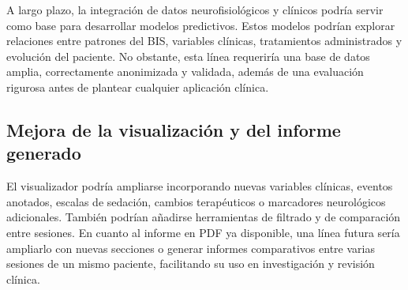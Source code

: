 \documentclass[
  spanish,
  a4paper,
  12pt,
  twoside]{memoir}
\begin{document}
A largo plazo, la integración de datos neurofisiológicos y clínicos
podría servir como base para desarrollar modelos predictivos. Estos
modelos podrían explorar relaciones entre patrones del BIS, variables
clínicas, tratamientos administrados y evolución del paciente. No
obstante, esta línea requeriría una base de datos amplia, correctamente
anonimizada y validada, además de una evaluación rigurosa antes de
plantear cualquier aplicación clínica.

\subsection{Mejora de la visualización y del informe
generado}\label{mejora-de-la-visualizaciuxf3n-y-del-informe-generado}

El visualizador podría ampliarse incorporando nuevas variables clínicas,
eventos anotados, escalas de sedación, cambios terapéuticos o marcadores
neurológicos adicionales. También podrían añadirse herramientas de
filtrado y de comparación entre sesiones. En cuanto al informe en PDF ya
disponible, una línea futura sería ampliarlo con nuevas secciones o
generar informes comparativos entre varias sesiones de un mismo
paciente, facilitando su uso en investigación y revisión clínica.


\backmatter

\end{document}
